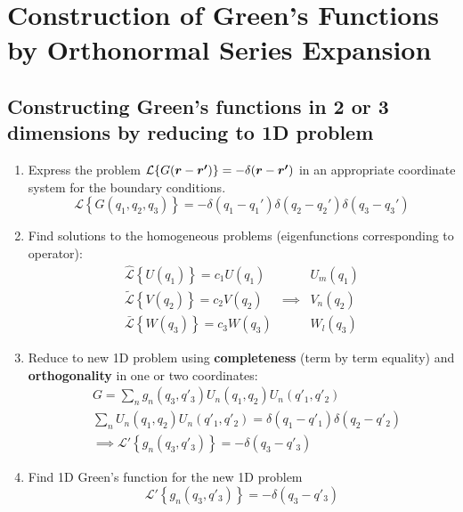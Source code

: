 \section{Construction of Green's Functions by Orthonormal Series Expansion}
\subsection{Constructing Green's functions in 2 or 3 dimensions by reducing to 1D problem}
\begin{enumerate}
  \item Express the problem $\mathcal{L}\{G(\boldsymbol{r}-\boldsymbol{r'})\} = -\delta(\boldsymbol{r}-\boldsymbol{r'})$ in an appropriate coordinate system for the boundary conditions.
        \begin{equation*}
          \mathcal{L}\left\{G(q_{1}, q_{2}, q_{3})\right\} = -\delta(q_{1}-q_{1}') \delta(q_{2}-q_{2}') \delta(q_{3}-q_{3}')
        \end{equation*}
  \item Find solutions to the homogeneous problems (eigenfunctions corresponding to operator):
        \begin{align*}
          \mathcal{\hat{L}} \left\{U(q_{1})\right\} = c_{1}U(q_{1}) & & U_{m}(q_{1})\\
          \mathcal{\tilde{L}} \left\{V(q_{2})\right\} = c_{2}V(q_{2}) & \implies & V_{n}(q_{2})\\
          \mathcal{\bar{L}} \left\{W(q_{3})\right\} = c_{3}W(q_{3}) & & W_{l}(q_{3})
        \end{align*}
  \item Reduce to new 1D problem using \textbf{completeness} (term by term equality) and \textbf{orthogonality} in one or two coordinates:
        \begin{align*}
          &G = \sum\limits_{n} g_{n}(q_{3},q'_{3}) U_{n}(q_{1},q_{2})U_{n}(q'_{1},q'_{2})\\
          &\sum\limits_{n} U_{n}(q_{1},q_{2}) U_{n}(q'_{1},q'_{2}) = \delta(q_{1}-q'_{1})\delta(q_{2}-q'_{2})\\
          &\implies \mathcal{L'}\left\{g_{n}(q_{3},q'_{3})\right\} = -\delta(q_{3}-q'_{3})
        \end{align*}
  \item Find 1D Green's function for the new 1D problem
        \begin{equation*}
          \mathcal{L'}\left\{g_{n}(q_{3},q'_{3})\right\} = -\delta(q_{3}-q'_{3})
        \end{equation*}
\end{enumerate}


